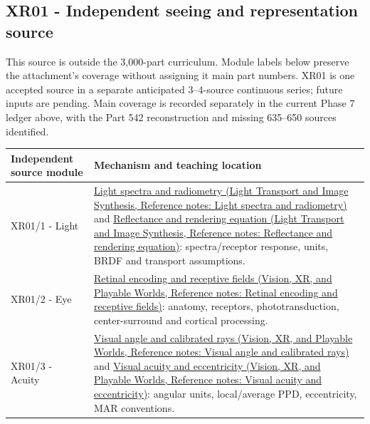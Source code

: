 \subsection{XR01 - Independent seeing and representation source}\label{appendix-fd090d982a15-xr01---independent-seeing-and-representation-source}

This source is outside the 3,000-part curriculum. Module labels below preserve the attachment's coverage without assigning it main part numbers. XR01 is one accepted source in a separate anticipated 3--4-source continuous series; future inputs are pending. Main coverage is recorded separately in the current Phase 7 ledger above, with the Part 542 reconstruction and missing 635--650 sources identified.

{\def\LTcaptype{none} %
\begin{longtable}[]{@{}
  >{\raggedright\arraybackslash}p{}
  >{\raggedright\arraybackslash}p{}@{}}
\toprule\noalign{}
\begin{minipage}[b]{\linewidth}\raggedright
Independent source module
\end{minipage} & \begin{minipage}[b]{\linewidth}\raggedright
Mechanism and teaching location
\end{minipage} \\
\midrule\noalign{}
\endhead
\bottomrule\noalign{}
\endlastfoot
XR01/1 - Light & \href{../04-Light-Transport-and-Image-Synthesis/main.pdf\#nameddest=appendix-215c2570199b}{Light spectra and radiometry (Light Transport and Image Synthesis, Reference notes: Light spectra and radiometry)} and \href{../04-Light-Transport-and-Image-Synthesis/main.pdf\#nameddest=appendix-96da0b153b77}{Reflectance and rendering equation (Light Transport and Image Synthesis, Reference notes: Reflectance and rendering equation)}: spectra/receptor response, units, BRDF and transport assumptions. \\
XR01/2 - Eye & \href{../07-Vision-XR-and-Playable-Worlds/main.pdf\#nameddest=appendix-7281c15ac44a}{Retinal encoding and receptive fields (Vision, XR, and Playable Worlds, Reference notes: Retinal encoding and receptive fields)}: anatomy, receptors, phototransduction, center-surround and cortical processing. \\
XR01/3 - Acuity & \href{../07-Vision-XR-and-Playable-Worlds/main.pdf\#nameddest=appendix-7d356c396d1a}{Visual angle and calibrated rays (Vision, XR, and Playable Worlds, Reference notes: Visual angle and calibrated rays)} and \href{../07-Vision-XR-and-Playable-Worlds/main.pdf\#nameddest=appendix-b491fc48c54b}{Visual acuity and eccentricity (Vision, XR, and Playable Worlds, Reference notes: Visual acuity and eccentricity)}: angular units, local/average PPD, eccentricity, MAR conventions. \\

\end{longtable}}
